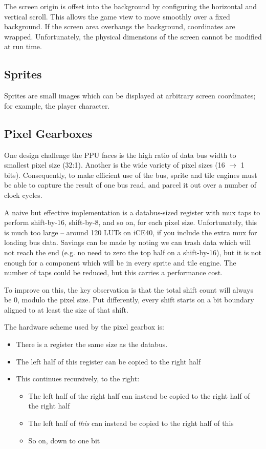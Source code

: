 The screen origin is offset into the background by configuring the horizontal and vertical scroll. This allows the game view to move smoothly over a fixed background. If the screen area overhangs the background, coordinates are wrapped. Unfortunately, the physical dimensions of the screen cannot be modified at run time.

\subsection{Sprites}

Sprites are small images which can be displayed at arbitrary screen coordinates; for example, the player character.

\subsection{Pixel Gearboxes}

One design challenge the PPU faces is the high ratio of data bus width to smallest pixel size (32:1). Another is the wide variety of pixel sizes (16 $\to$ 1 bits). Consequently, to make efficient use of the bus, sprite and tile engines must be able to capture the result of one bus read, and parcel it out over a number of clock cycles.

A naive but effective implementation is a databus-sized register with mux taps to perform shift-by-16, shift-by-8, and so on, for each pixel size. Unfortunately, this is much too large -- around 120 LUTs on iCE40, if you include the extra mux for loading bus data. Savings can be made by noting we can trash data which will not reach the end (e.g. no need to zero the top half on a shift-by-16), but it is not enough for a component which will be in every sprite and tile engine. The number of taps could be reduced, but this carries a performance cost.

To improve on this, the key observation is that the total shift count will always be 0, modulo the pixel size. Put differently, every shift starts on a bit boundary aligned to at least the size of that shift.

The hardware scheme used by the pixel gearbox is:
\begin{itemize}
	\item There is a register the same size as the databus.
	\item The left half of this register can be copied to the right half
	\item This continues recursively, to the right:
	\begin{itemize}
		\item The left half of the right half can instead be copied to the right half of the right half
		\item The left half of {\it this} can instead be copied to the right half of this
		\item So on, down to one bit
	\end{itemize}
\end{itemize}

